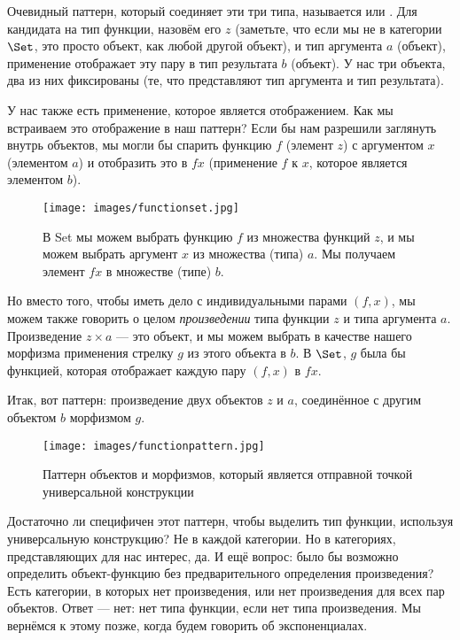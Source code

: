 Очевидный паттерн, который соединяет эти три типа, называется
 или . Для кандидата на
тип функции, назовём его $z$ (заметьте, что если мы не в
категории $\Set$, это просто объект, как любой другой
объект), и тип аргумента $a$ (объект), применение
отображает эту пару в тип результата $b$ (объект). У нас три
объекта, два из них фиксированы (те, что представляют тип аргумента и
тип результата).

У нас также есть применение, которое является отображением. Как мы встраиваем
это отображение в наш паттерн? Если бы нам разрешили заглянуть внутрь
объектов, мы могли бы спарить функцию $f$ (элемент $z$)
с аргументом $x$ (элементом $a$) и отобразить это в
$f x$ (применение $f$ к $x$, которое является
элементом $b$).

\begin{figure}[H]
  \centering\texttt{[image: images/functionset.jpg]}
  \caption{В Set мы можем выбрать функцию $f$ из множества функций $z$, и мы можем
    выбрать аргумент $x$ из множества (типа) $a$. Мы получаем элемент $f x$ в
    множестве (типе) $b$.}
\end{figure}

\noindent
Но вместо того, чтобы иметь дело с индивидуальными парами $(f, x)$, мы можем также
говорить о целом \emph{произведении} типа функции $z$
и типа аргумента $a$. Произведение $z\times{}a$ --- это объект,
и мы можем выбрать в качестве нашего морфизма применения стрелку $g$ из
этого объекта в $b$. В $\Set$, $g$ была бы
функцией, которая отображает каждую пару $(f, x)$ в $f x$.

Итак, вот паттерн: произведение двух объектов $z$ и
$a$, соединённое с другим объектом $b$ морфизмом $g$.

\begin{figure}[H]
  \centering
  \texttt{[image: images/functionpattern.jpg]}
  \caption{Паттерн объектов и морфизмов, который является отправной точкой
    универсальной конструкции}
\end{figure}

\noindent
Достаточно ли специфичен этот паттерн, чтобы выделить тип функции, используя
универсальную конструкцию? Не в каждой категории. Но в категориях,
представляющих для нас интерес, да. И ещё вопрос: было бы возможно
определить объект-функцию без предварительного определения произведения? Есть
категории, в которых нет произведения, или нет произведения для
всех пар объектов. Ответ --- нет: нет типа функции, если
нет типа произведения. Мы вернёмся к этому позже, когда будем говорить
об экспоненциалах.

